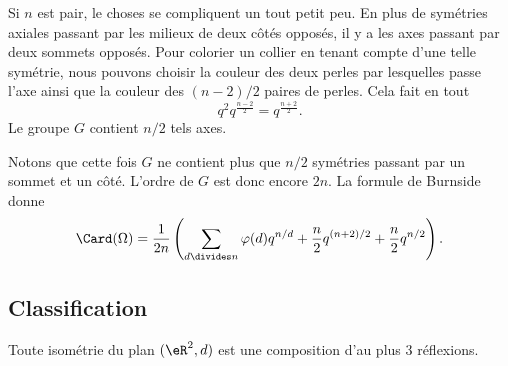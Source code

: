 Si \( n\) est pair, le choses se compliquent un tout petit peu. En plus de symétries axiales passant par les milieux de deux côtés opposés, il y a les axes passant par deux sommets opposés. Pour colorier un collier en tenant compte d'une telle symétrie, nous pouvons choisir la couleur des deux perles par lesquelles passe l'axe ainsi que la couleur des \( (n-2)/2\) paires de perles. Cela fait en tout
\begin{equation}
	q^2q^{\frac{ n-2 }{2}}=q^{\frac{ n+2 }{2}}.
\end{equation}
Le groupe \( G\) contient \( n/2\) tels axes.

Notons que cette fois \( G\) ne contient plus que \( n/2\) symétries passant par un sommet et un côté. L'ordre de \( G\) est donc encore \( 2n\). La formule de Burnside donne
\begin{equation}
	\Card(\Omega)=\frac{1}{ 2n }\left( \sum_{d\divides n}\varphi(d)q^{n/d}+\frac{ n }{2}q^{(n+2)/2}+\frac{ n }{2}q^{n/2} \right).
\end{equation}

\subsection{Classification}

\begin{theorem}      \label{THOooRORQooTDWFdv}
	Toute isométrie du plan \( (\eR^2,d)\) est une composition d'au plus \( 3\) réflexions.
\end{theorem}

